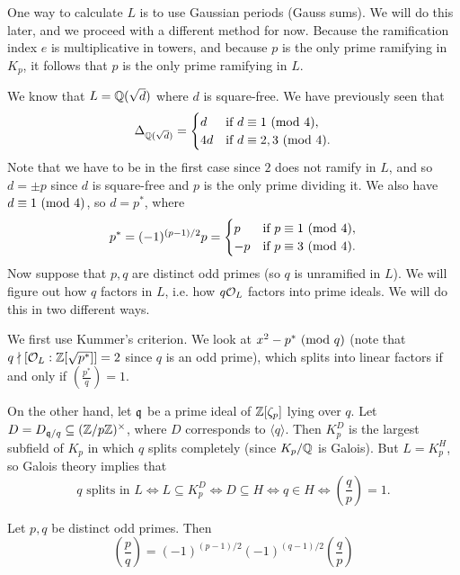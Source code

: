 \begin{remark}
  One way to calculate $L$ is to use Gaussian
  periods (Gauss sums). We will do this later, and
  we proceed with a different method for now.
  Because the ramification index $e$ is multiplicative
  in towers, and because $p$ is the only prime
  ramifying in $K_p$, it follows that $p$ is the
  only prime ramifying in $L$.

  We know that $L = \mathbb{Q}(\sqrt{d})$ where $d$ is
  square-free. We have previously seen that
  \[
    \Delta_{\mathbb{Q}(\sqrt{d})} =
    \begin{cases}
      d & \text{if $d \equiv 1 \ (\mathrm{mod}\ 4)$}, \\
      4d & \text{if $d \equiv 2, 3 \ (\mathrm{mod}\ 4)$}.
    \end{cases}
  \]
  Note that we have to be in the first case
  since $2$ does not ramify in $L$, and so
  $d = \pm p$ since $d$ is square-free and $p$ is
  the only prime dividing it. We also have $d \equiv 1 \ (\mathrm{mod}\ 4)$,
  so $d = p^*$, where
  \[
    p^* = (-1)^{(p - 1) / 2} p =
    \begin{cases}
      p & \text{if $p \equiv 1 \ (\mathrm{mod}\ 4)$}, \\
      -p & \text{if $p \equiv 3 \ (\mathrm{mod}\ 4)$}.
    \end{cases}
  \]
  Now suppose that $p, q$ are distinct odd primes
  (so $q$ is unramified in $L$). We will figure out
  how $q$ factors in $L$, i.e. how $q \mathcal{O}_L$ factors
  into prime ideals. We will do this in two different
  ways.

  We first use Kummer's criterion. We look at
  $x^2 - p^* \ (\mathrm{mod}\ q)$ (note that
  $q \nmid [\mathcal{O}_L : \mathbb{Z}[\sqrt{p^*}]] = 2$ since $q$ is
  an odd prime), which
  splits into linear factors if and only if
  $(\frac{p^*}{q}) = 1$.

  On the other hand, let $\mathfrak{q}$ be a prime ideal of
  $\mathbb{Z}[\zeta_p]$ lying over $q$.
  Let $D = D_{\mathfrak{q} / q} \subseteq (\mathbb{Z} / p\mathbb{Z})^\times$, where
  $D$ corresponds to $\langle q \rangle$. Then
  $K_p^D$ is the largest
  subfield of $K_p$ in which $q$ splits completely
  (since $K_p / \mathbb{Q}$ is Galois). But
  $L = K_p^H$, so Galois theory implies that
  \[
    \text{$q$ splits in $L$}
    \iff L \subseteq K_p^D \iff D \subseteq H
    \iff q \in H
    \iff \left(\frac{q}{p}\right) = 1.
  \]
\end{remark}

\begin{corollary}\label{cor:quadratic-reciprocity}
  Let $p, q$ be distinct odd primes. Then
  \[
    \left(\frac{p}{q}\right)
    = (-1)^{(p - 1) / 2} (-1)^{(q - 1) / 2}
    \left(\frac{q}{p}\right)
  \]
\end{corollary}

